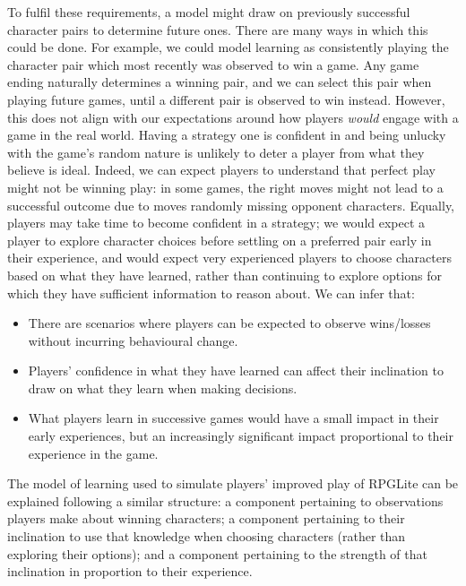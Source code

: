 To fulfil these requirements, a model might draw on previously successful
character pairs to determine future ones. There are many ways in which this
could be done. For example, we could model learning as consistently playing the
character pair which most recently was observed to win a game. Any game ending
naturally determines a winning pair, and we can select this pair when playing
future games, until a different pair is observed to win instead. However, this
does not align with our expectations around how players \emph{would} engage with
a game in the real world. Having a strategy one is confident in and being
unlucky with the game's random nature is unlikely to deter a player from what
they believe is ideal. Indeed, we can expect players to understand
that perfect play might not be winning play: in some games, the right moves
might not lead to a successful outcome due to moves randomly missing opponent
characters. Equally, players may take time to become confident in a strategy; we
would expect a player to explore character choices before settling on a
preferred pair early in their experience, and would expect very experienced
players to choose characters based on what they have learned, rather than
continuing to explore options for which they have sufficient information to
reason about. We can infer that:

\begin{itemize}
  \item There are scenarios where players can be expected to observe wins/losses
  without incurring behavioural change.
  \item Players' confidence in what they have learned can affect their
  inclination to draw on what they learn when making decisions.
  \item What players learn in successive games would have a small impact in
  their early experiences, but an increasingly significant impact proportional
  to their experience in the game.
\end{itemize}

The model of learning used to simulate players' improved play of RPGLite can be
explained following a similar structure: a component pertaining to observations
players make about winning characters; a component pertaining to their
inclination to use that knowledge when choosing characters (rather than
exploring their options); and a component pertaining to the strength of that
inclination in proportion to their experience.


